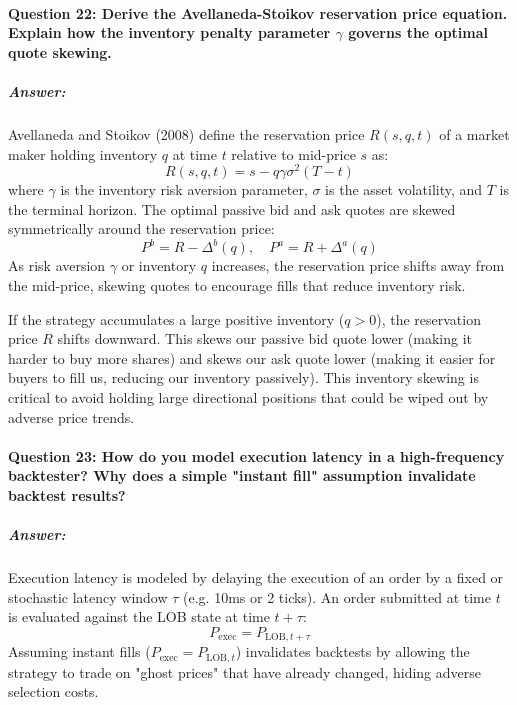 \documentclass[11pt,a4paper]{article}
\begin{document}
\paragraph{Question 22: Derive the Avellaneda-Stoikov reservation price equation. Explain how the inventory penalty parameter $\gamma$ governs the optimal quote skewing.}
\subparagraph{Answer:}
Avellaneda and Stoikov (2008) define the reservation price $R(s, q, t)$ of a market maker holding inventory $q$ at time $t$ relative to mid-price $s$ as:
\begin{equation}
    R(s, q, t) = s - q \gamma \sigma^2 (T - t)
\end{equation}
where $\gamma$ is the inventory risk aversion parameter, $\sigma$ is the asset volatility, and $T$ is the terminal horizon. The optimal passive bid and ask quotes are skewed symmetrically around the reservation price:
\begin{equation}
    P^b = R - \Delta^b(q), \quad P^a = R + \Delta^a(q)
\end{equation}
As risk aversion $\gamma$ or inventory $q$ increases, the reservation price shifts away from the mid-price, skewing quotes to encourage fills that reduce inventory risk.

If the strategy accumulates a large positive inventory ($q > 0$), the reservation price $R$ shifts downward. This skews our passive bid quote lower (making it harder to buy more shares) and skews our ask quote lower (making it easier for buyers to fill us, reducing our inventory passively). This inventory skewing is critical to avoid holding large directional positions that could be wiped out by adverse price trends.

\paragraph{Question 23: How do you model execution latency in a high-frequency backtester? Why does a simple "instant fill" assumption invalidate backtest results?}
\subparagraph{Answer:}
Execution latency is modeled by delaying the execution of an order by a fixed or stochastic latency window $\tau$ (e.g. 10ms or 2 ticks). An order submitted at time $t$ is evaluated against the LOB state at time $t+\tau$:
\begin{equation}
    P_{\text{exec}} = P_{\text{LOB}, t+\tau}
\end{equation}
Assuming instant fills ($P_{\text{exec}} = P_{\text{LOB}, t}$) invalidates backtests by allowing the strategy to trade on "ghost prices" that have already changed, hiding adverse selection costs.
\end{document}
